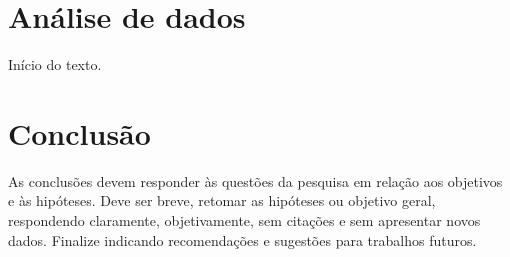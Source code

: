 \documentclass[
	12pt,				%
	oneside,			%
	a4paper,			%
	chapter=TITLE,		%
	section=TITLE,		%
	english,			%
	brazil,				%
	]{abntex2}
\begin{document}
\chapter{Análise de dados}

Início do texto.

\chapter{Conclusão}

As conclusões devem responder às questões da pesquisa em relação aos objetivos e às hipóteses.
Deve ser breve, retomar as hipóteses ou objetivo geral, respondendo claramente, objetivamente, sem citações e sem apresentar novos dados.
Finalize indicando recomendações e sugestões para trabalhos futuros.


\postextual
\end{document}
